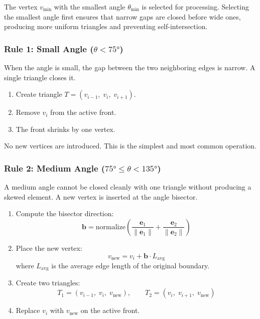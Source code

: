 \documentclass[12pt,a4paper]{article}
\begin{document}
The vertex $v_{\min}$ with the smallest angle $\theta_{\min}$ is selected for processing. Selecting the smallest angle first ensures that narrow gaps are closed before wide ones, producing more uniform triangles and preventing self-intersection.

\subsubsection{Rule 1: Small Angle ($\theta < 75°$)}

When the angle is small, the gap between the two neighboring edges is narrow. A single triangle closes it.

\begin{enumerate}[leftmargin=2em]
  \item Create triangle $T = (v_{i-1},\; v_i,\; v_{i+1})$.
  \item Remove $v_i$ from the active front.
  \item The front shrinks by one vertex.
\end{enumerate}

No new vertices are introduced. This is the simplest and most common operation.

\subsubsection{Rule 2: Medium Angle ($75° \leq \theta < 135°$)}

A medium angle cannot be closed cleanly with one triangle without producing a skewed element. A new vertex is inserted at the angle bisector.

\begin{enumerate}[leftmargin=2em]
  \item Compute the bisector direction:
    \[
      \mathbf{b} = \mathrm{normalize}\!\left(\frac{\mathbf{e}_1}{\|\mathbf{e}_1\|} + \frac{\mathbf{e}_2}{\|\mathbf{e}_2\|}\right)
    \]
  \item Place the new vertex:
    \[
      v_{\text{new}} = v_i + \mathbf{b} \cdot L_{\text{avg}}
    \]
    where $L_{\text{avg}}$ is the average edge length of the original boundary.
  \item Create two triangles:
    \[
      T_1 = (v_{i-1},\; v_i,\; v_{\text{new}}), \qquad T_2 = (v_i,\; v_{i+1},\; v_{\text{new}})
    \]
  \item Replace $v_i$ with $v_{\text{new}}$ on the active front.
\end{enumerate}
\end{document}
